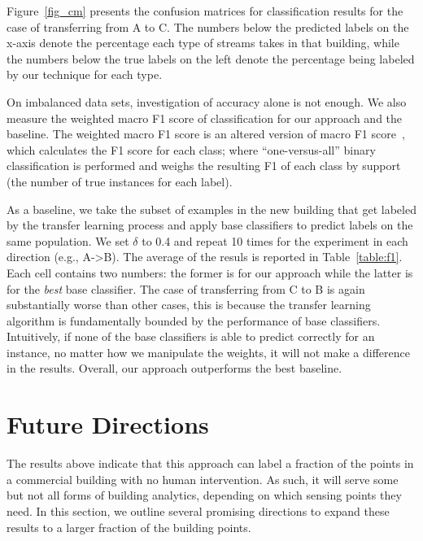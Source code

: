 Figure~\ref{fig_cm} presents the confusion matrices for classification results for the case of transferring from A to C.
The numbers below the predicted labels on the x-axis denote the percentage each type of streams takes in that building, while the numbers below the true labels on the left denote the percentage being labeled by our technique for each type.

On imbalanced data sets, investigation of accuracy alone is not enough. We also measure the weighted macro F1 score of 
classification for our approach and the baseline. The weighted macro F1 score is an altered version of macro F1 score~\cite{yang}, 
which calculates the F1 score for each class; where ``one-versus-all'' binary classification is performed and weighs the resulting F1 of each class by support (the number of true instances for each label). 

As a baseline, we take the subset of examples in the new building that get labeled by the transfer learning process and apply base classifiers to predict labels on the same population. 
We set $\delta$ to 0.4 and  
repeat 10 times for the experiment in each direction (e.g., A->B). The average of the resuls is reported in Table~\ref{table:f1}. 
Each cell contains two numbers: the former is for our approach while the latter is for the {\it best} base classifier.
The case of transferring from C to B is again substantially worse than other cases, this is because the transfer learning algorithm is fundamentally bounded by the performance of base classifiers. 
Intuitively, if none of the base classifiers is able to predict correctly for an instance, no matter how we manipulate the weights, it will not make a difference in the results.
Overall, our approach outperforms the best baseline.


\section{Future Directions}

The results above indicate that this approach can label a fraction of
the points in a commercial building with no human intervention. As
such, it will serve some but not all forms of building analytics,
depending on which sensing points they need. In this section, we
outline several promising directions to expand these results to a
larger fraction of the building points.

